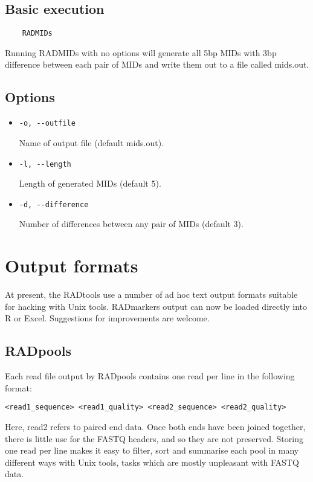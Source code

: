 \documentclass[a4paper]{article}
\begin{document}
\subsection{Basic execution}

\begin{verbatim}
    RADMIDs
\end{verbatim}

Running RADMIDs with no options will generate all 5bp MIDs with 3bp difference between each pair of MIDs and write them out to a file called mids.out.

\subsection{Options}

\begin{itemize}
    \item \verb|-o, --outfile|
    
    Name of output file (default mids.out).
    
    \item \verb|-l, --length|
    
    Length of generated MIDs (default 5).
    
    \item \verb|-d, --difference|
    
    Number of differences between any pair of MIDs (default 3).
\end{itemize}


\section{Output formats}

At present, the RADtools use a number of ad hoc text output formats suitable for hacking with Unix tools. RADmarkers output can now be loaded directly into R or Excel. Suggestions for improvements are welcome.

\subsection{RADpools}

Each read file output by RADpools contains one read per line in the following format:

\begin{verbatim}
<read1_sequence> <read1_quality> <read2_sequence> <read2_quality>
\end{verbatim}

Here, read2 refers to paired end data. Once both ends have been joined together, there is little use for the FASTQ headers, and so they are not preserved. Storing one read per line makes it easy to filter, sort and summarise each pool in many different ways with Unix tools, tasks which are mostly unpleasant with FASTQ data.
\end{document}
